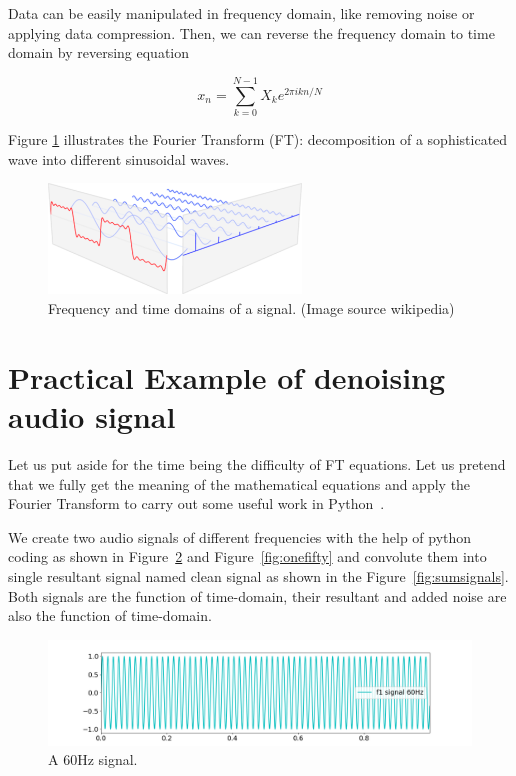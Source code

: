 \documentclass[a4paper, 12pt]{scrartcl}
\begin{document}
Data can be easily manipulated in frequency domain, like removing noise or applying data compression.
Then, we can reverse the frequency domain to time domain by reversing equation

\begin{equation}
  x_n = \sum_{k=0}^{N-1} X_k e^{2 \pi i k n / N}
\end{equation}

Figure \ref{fig:fourier} illustrates the Fourier Transform (FT): decomposition of a sophisticated wave into different sinusoidal waves.

\begin{figure}[H] 
  \centering
  \includegraphics[width=0.6\textwidth]{img/fourier-dimensions.png}
  \caption{Frequency and time domains of a signal. (Image source wikipedia)}
  \label{fig:fourier}
\end{figure}
\section{Practical Example of denoising audio signal}
Let us put aside for the time being the difficulty of FT equations.
Let us pretend that we fully get the meaning of the mathematical equations and apply the Fourier Transform to carry out some useful work in Python~\cite{CleanUpNoise}.

We create two audio signals of different frequencies with the help of python coding as shown in Figure~\ref{fig:sixty} and Figure~\ref{fig:onefifty} 
and convolute them into single resultant signal named clean signal as shown in the Figure~\ref{fig:sumsignals}. 
Both signals are the function of time-domain, their resultant and added noise are also the function of time-domain.

\begin{figure}[H] 
  \centering
  \includegraphics[width=\textwidth]{img/signal_60hz.png}
  \caption{A 60Hz signal.}
  \label{fig:sixty}
\end{figure}
\end{document}
